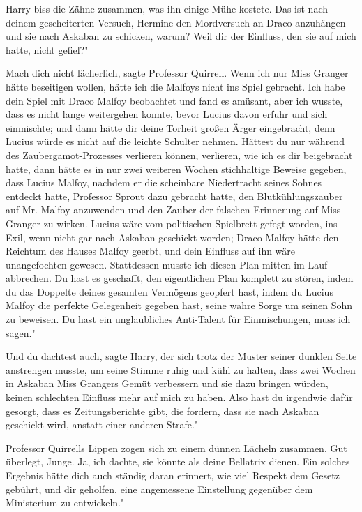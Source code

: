 Harry biss die Zähne zusammen, was ihn einige Mühe kostete. \glqq Das ist nach
deinem gescheiterten Versuch, Hermine den Mordversuch an Draco anzuhängen und
sie nach Askaban zu schicken, warum? Weil dir der Einfluss, den sie auf mich
hatte, nicht gefiel?"

\glqq Mach dich nicht lächerlich\grqq{}, sagte Professor Quirrell. \glqq Wenn
ich nur Miss Granger hätte beseitigen wollen, hätte ich die Malfoys nicht ins
Spiel gebracht. Ich habe dein Spiel mit Draco Malfoy beobachtet und fand es
amüsant, aber ich wusste, dass es nicht lange weitergehen konnte, bevor Lucius
davon erfuhr und sich einmischte; und dann hätte dir deine Torheit großen Ärger
eingebracht, denn Lucius würde es nicht auf die leichte Schulter nehmen. Hättest
du nur während des Zaubergamot-Prozesses verlieren können, verlieren, wie ich es
dir beigebracht hatte, dann hätte es in nur zwei weiteren Wochen stichhaltige
Beweise gegeben, dass Lucius Malfoy, nachdem er die scheinbare Niedertracht
seines Sohnes entdeckt hatte, Professor Sprout dazu gebracht hatte, den
Blutkühlungszauber auf Mr. Malfoy anzuwenden und den Zauber der falschen
Erinnerung auf Miss Granger zu wirken. Lucius wäre vom politischen Spielbrett
gefegt worden, ins Exil, wenn nicht gar nach Askaban geschickt worden; Draco
Malfoy hätte den Reichtum des Hauses Malfoy geerbt, und dein Einfluss auf ihn
wäre unangefochten gewesen. Stattdessen musste ich diesen Plan mitten im Lauf
abbrechen. Du hast es geschafft, den eigentlichen Plan komplett zu stören, indem
du das Doppelte deines gesamten Vermögens geopfert hast, indem du Lucius Malfoy
die perfekte Gelegenheit gegeben hast, seine wahre Sorge um seinen Sohn zu
beweisen. Du hast ein unglaubliches Anti-Talent für Einmischungen, muss ich
sagen."

\glqq Und du dachtest auch\grqq{}, sagte Harry, der sich trotz der Muster seiner
dunklen Seite anstrengen musste, um seine Stimme ruhig und kühl zu halten, \glqq
dass zwei Wochen in Askaban Miss Grangers Gemüt verbessern und sie dazu bringen
würden, keinen schlechten Einfluss mehr auf mich zu haben. Also hast du
irgendwie dafür gesorgt, dass es Zeitungsberichte gibt, die fordern, dass sie
nach Askaban geschickt wird, anstatt einer anderen Strafe."

Professor Quirrells Lippen zogen sich zu einem dünnen Lächeln zusammen. \glqq
Gut überlegt, Junge. Ja, ich dachte, sie könnte als deine Bellatrix dienen. Ein
solches Ergebnis hätte dich auch ständig daran erinnert, wie viel Respekt dem
Gesetz gebührt, und dir geholfen, eine angemessene Einstellung gegenüber dem
Ministerium zu entwickeln."

